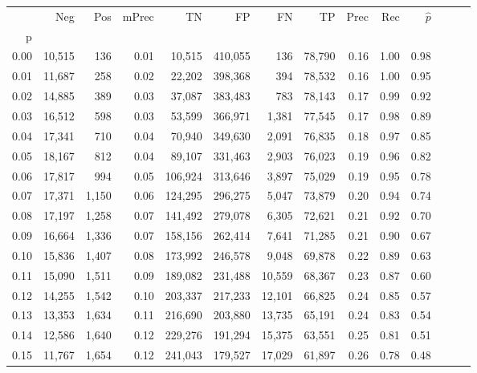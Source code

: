 \begin{tabular}{rrrrrrrrrrrrrr}
\toprule
{} &     Neg &    Pos & mPrec &       TN &       FP &      FN &      TP &  Prec &   Rec & $\hat{p}$ \\
p    &         &        &       &          &          &         &         &       &       &           \\
\midrule
0.00 &  10,515 &    136 &  0.01 &   10,515 &  410,055 &     136 &  78,790 &  0.16 &  1.00 &      0.98 \\
0.01 &  11,687 &    258 &  0.02 &   22,202 &  398,368 &     394 &  78,532 &  0.16 &  1.00 &      0.95 \\
0.02 &  14,885 &    389 &  0.03 &   37,087 &  383,483 &     783 &  78,143 &  0.17 &  0.99 &      0.92 \\
0.03 &  16,512 &    598 &  0.03 &   53,599 &  366,971 &   1,381 &  77,545 &  0.17 &  0.98 &      0.89 \\
0.04 &  17,341 &    710 &  0.04 &   70,940 &  349,630 &   2,091 &  76,835 &  0.18 &  0.97 &      0.85 \\
0.05 &  18,167 &    812 &  0.04 &   89,107 &  331,463 &   2,903 &  76,023 &  0.19 &  0.96 &      0.82 \\
0.06 &  17,817 &    994 &  0.05 &  106,924 &  313,646 &   3,897 &  75,029 &  0.19 &  0.95 &      0.78 \\
0.07 &  17,371 &  1,150 &  0.06 &  124,295 &  296,275 &   5,047 &  73,879 &  0.20 &  0.94 &      0.74 \\
0.08 &  17,197 &  1,258 &  0.07 &  141,492 &  279,078 &   6,305 &  72,621 &  0.21 &  0.92 &      0.70 \\
0.09 &  16,664 &  1,336 &  0.07 &  158,156 &  262,414 &   7,641 &  71,285 &  0.21 &  0.90 &      0.67 \\
0.10 &  15,836 &  1,407 &  0.08 &  173,992 &  246,578 &   9,048 &  69,878 &  0.22 &  0.89 &      0.63 \\
0.11 &  15,090 &  1,511 &  0.09 &  189,082 &  231,488 &  10,559 &  68,367 &  0.23 &  0.87 &      0.60 \\
0.12 &  14,255 &  1,542 &  0.10 &  203,337 &  217,233 &  12,101 &  66,825 &  0.24 &  0.85 &      0.57 \\
0.13 &  13,353 &  1,634 &  0.11 &  216,690 &  203,880 &  13,735 &  65,191 &  0.24 &  0.83 &      0.54 \\
0.14 &  12,586 &  1,640 &  0.12 &  229,276 &  191,294 &  15,375 &  63,551 &  0.25 &  0.81 &      0.51 \\
0.15 &  11,767 &  1,654 &  0.12 &  241,043 &  179,527 &  17,029 &  61,897 &  0.26 &  0.78 &      0.48 \\

\end{tabular}
